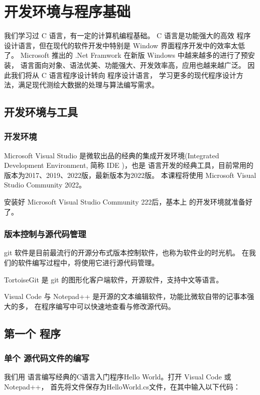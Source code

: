 
\chapter{ \cs 开发环境与程序基础}

我们学习过 C 语言，有一定的计算机编程基础。 C 语言是功能强大的高效
程序设计语言，但在现代的软件开发中特别是 Window 界面程序开发中的效率太低了。
Microsoft 推出的 .Net Framwork 在新版 Windows 中越来越多的进行了预安装，
 \cs 语言面向对象、语法优美、功能强大、开发效率高，应用也越来越广泛。
因此我们将从 C 语言程序设计转向 \cs 程序设计语言，
学习更多的现代程序设计方法，满足现代测绘大数据的处理与算法编写需求。

\section{ \cs  开发环境与工具}

\subsection{ \cs  开发环境}
Microsoft Visual Studio 是微软出品的经典的集成开发环境(Integrated Development Environment,
简称 IDE )，也是 \cs 语言开发的经典工具，目前常用的版本为2017、2019、2022版，最新版本为2022版。
本课程将使用 Microsoft Visual Studio Community 2022。

安装好 Microsoft Visual Studio Community 222后，基本上 \cs  的开发环境就准备好了。

\subsection{版本控制与源代码管理}
git 软件是目前最流行的开源分布式版本控制软件，也称为软件业的时光机。
在我们的软件编写过程中，将使用它进行源代码管理。

TortoiseGit 是 git 的图形化客户端软件，开源软件，支持中文等语言。

Visual Code 与  Notepad++ 是开源的文本编辑软件，功能比微软自带的记事本强大的多，
在程序编写中可以快速地查看与修改源代码。


\section{第一个 \cs  程序}

\subsection{单个 \cs  源代码文件的编写}
我们用 \cs 语言编写经典的C语言入门程序Hello World。打开 Visual Code 或 Notepad++，
首先将文件保存为HelloWorld.cs文件，在其中输入以下代码：


